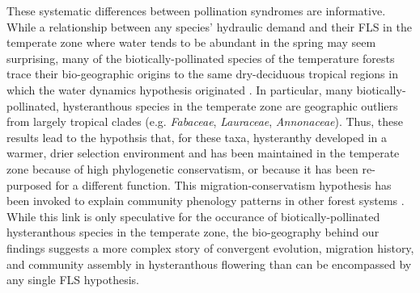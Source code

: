 \documentclass{article}
\begin{document}
\noindent These systematic differences between pollination syndromes are informative. While a relationship between any species' hydraulic demand and their FLS in the temperate zone where water tends to be abundant in the spring \citep{Polgar2011} may seem surprising, many of the biotically-pollinated species of the temperature forests trace their bio-geographic origins to the same dry-deciduous tropical regions \citep{Daubenmire1972} in which the water dynamics hypothesis originated \citep{Janzen1967,Franklin2016}. In particular, many biotically-pollinated, hysteranthous species in the temperate zone are geographic outliers from largely tropical clades (e.g. \textit{Fabaceae}, \textit{Lauraceae}, \textit{Annonaceae}). Thus, these results lead to the hypothsis that, for these taxa, hysteranthy developed in a warmer, drier selection environment and has been maintained in the temperate zone because of high phylogenetic conservatism, or because it has been re-purposed for a different function. %
This migration-conservatism hypothesis has been invoked to explain community phenology patterns in other forest systems \citep[i.e. general flowering in dipterocarps,][]{Ashton1988, Kurten2018}. While this link is only speculative for the occurance of biotically-pollinated hysteranthous species in the temperate zone, the bio-geography behind our findings suggests a more complex story of convergent evolution, migration history, and community assembly in hysteranthous flowering than can be encompassed by any single FLS hypothesis.\\


\end{document}
